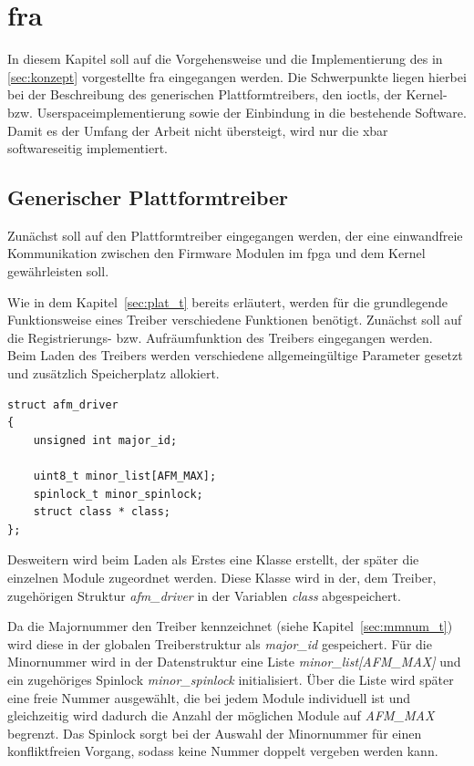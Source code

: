 \chapter{\acl{fra}} \label{sec:haupt}
In diesem Kapitel soll auf die  Vorgehensweise und die Implementierung des in \ref{sec:konzept} vorgestellte \ac{fra} eingegangen werden. Die Schwerpunkte liegen hierbei bei der Beschreibung des generischen Plattformtreibers, den \ac{ioctl}s, der Kernel- bzw. Userspaceimplementierung sowie der Einbindung in die bestehende Software. Damit es der Umfang der Arbeit nicht übersteigt, wird nur die \acl{xbar} softwareseitig implementiert.


\section{Generischer Plattformtreiber} \label{sec:plat}
Zunächst soll auf den Plattformtreiber eingegangen werden, der eine einwandfreie Kommunikation zwischen den Firmware Modulen im \ac{fpga} und dem Kernel gewährleisten soll.


Wie in dem Kapitel~\ref{sec:plat_t} bereits erläutert, werden für die grundlegende Funktionsweise eines Treiber verschiedene Funktionen benötigt. Zunächst soll auf die Registrierungs- bzw. Aufräumfunktion des Treibers eingegangen werden.\\


Beim Laden des Treibers werden verschiedene allgemeingültige Parameter gesetzt und zusätzlich Speicherplatz allokiert. 
\begin{lstfloat}
\begin{lstlisting}
struct afm_driver
{
	unsigned int major_id;

	uint8_t minor_list[AFM_MAX];
	spinlock_t minor_spinlock;
	struct class * class;
};
\end{lstlisting}
\end{lstfloat}

Desweitern wird beim Laden als Erstes eine Klasse erstellt, der später die einzelnen Module zugeordnet werden. Diese Klasse wird in der, dem Treiber, zugehörigen Struktur \textit{afm\_driver} in der Variablen \textit{class} abgespeichert. 


Da die Majornummer den Treiber kennzeichnet (siehe Kapitel~\ref{sec:mmnum_t}) wird diese in der globalen Treiberstruktur als \textit{major\_id} gespeichert. Für die Minornummer wird in der Datenstruktur eine Liste \textit{minor\_list[AFM\_MAX]} und ein zugehöriges Spinlock \textit{minor\_spinlock} initialisiert. Über die Liste wird später eine freie Nummer ausgewählt, die bei jedem Module individuell ist und gleichzeitig wird dadurch die Anzahl der möglichen Module auf \textit{AFM\_MAX} begrenzt. Das Spinlock sorgt bei der Auswahl der Minornummer für einen konfliktfreien Vorgang, sodass keine Nummer doppelt vergeben werden kann. 


